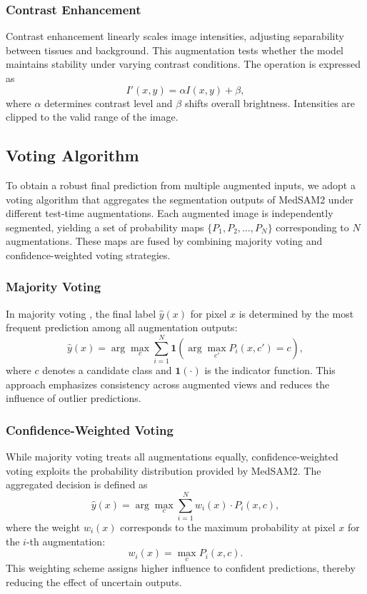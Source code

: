 \documentclass{article}
\begin{document}
\subsubsection{Contrast Enhancement}
Contrast enhancement \cite{goceri2023medical} linearly scales image intensities, adjusting separability between tissues and background. This augmentation tests whether the model maintains stability under varying contrast conditions. The operation is expressed as
\[
I'(x,y) = \alpha I(x,y) + \beta,
\]
where $\alpha$ determines contrast level and $\beta$ shifts overall brightness. Intensities are clipped to the valid range of the image.

\subsection{Voting Algorithm}
To obtain a robust final prediction from multiple augmented inputs, we adopt a voting algorithm \cite{tasci2021voting} that aggregates the segmentation outputs of MedSAM2 under different test-time augmentations. Each augmented image is independently segmented, yielding a set of probability maps $\{P_1, P_2, \ldots, P_N\}$ corresponding to $N$ augmentations. These maps are fused by combining majority voting and confidence-weighted voting strategies.

\subsubsection{Majority Voting}
In majority voting \cite{lam1997application}, the final label $\hat{y}(x)$ for pixel $x$ is determined by the most frequent prediction among all augmentation outputs:
\[
\hat{y}(x) = \arg\max_{c} \sum_{i=1}^{N} \mathbf{1}\!\left( \arg\max_{c'} P_i(x,c') = c \right),
\]
where $c$ denotes a candidate class and $\mathbf{1}(\cdot)$ is the indicator function. This approach emphasizes consistency across augmented views and reduces the influence of outlier predictions.

\subsubsection{Confidence-Weighted Voting}
While majority voting treats all augmentations equally, confidence-weighted voting \cite{toth2008classification} exploits the probability distribution provided by MedSAM2. The aggregated decision is defined as
\[
\hat{y}(x) = \arg\max_{c} \sum_{i=1}^{N} w_i(x) \cdot P_i(x,c),
\]
where the weight $w_i(x)$ corresponds to the maximum probability at pixel $x$ for the $i$-th augmentation:
\[
w_i(x) = \max_{c} P_i(x,c).
\]
This weighting scheme assigns higher influence to confident predictions, thereby reducing the effect of uncertain outputs.
\end{document}
